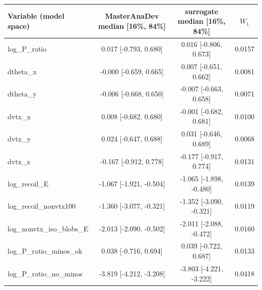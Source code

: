 \begin{tabular}{lccc}
\toprule
Variable (model space) & MasterAnaDev median [16\%, 84\%] & surrogate median [16\%, 84\%] & $W_1$ \\
\midrule
log\_P\_ratio & 0.017 [-0.793, 0.680] & 0.016 [-0.806, 0.673] & 0.0157 \\
dtheta\_x & -0.000 [-0.659, 0.665] & 0.007 [-0.651, 0.662] & 0.0081 \\
dtheta\_y & -0.006 [-0.668, 0.650] & -0.007 [-0.663, 0.658] & 0.0071 \\
dvtx\_x & 0.008 [-0.682, 0.680] & -0.001 [-0.682, 0.681] & 0.0100 \\
dvtx\_y & 0.024 [-0.647, 0.688] & 0.031 [-0.646, 0.689] & 0.0068 \\
dvtx\_z & -0.167 [-0.912, 0.778] & -0.177 [-0.917, 0.774] & 0.0131 \\
log\_recoil\_E & -1.067 [-1.921, -0.504] & -1.065 [-1.898, -0.480] & 0.0139 \\
log\_recoil\_nonvtx100 & -1.360 [-3.077, -0.321] & -1.352 [-3.090, -0.321] & 0.0119 \\
log\_nonvtx\_iso\_blobs\_E & -2.013 [-2.090, -0.502] & -2.011 [-2.088, -0.472] & 0.0160 \\
log\_P\_ratio\_minos\_ok & 0.038 [-0.716, 0.694] & 0.039 [-0.722, 0.687] & 0.0133 \\
log\_P\_ratio\_no\_minos & -3.819 [-4.212, -3.208] & -3.803 [-4.221, -3.222] & 0.0418 \\
\bottomrule
\end{tabular}
